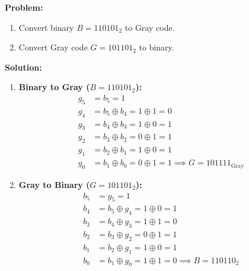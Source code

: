 \begin{examplebox}
\textbf{Problem:}
\begin{enumerate}
    \item Convert binary $B = 110101_2$ to Gray code.
    \item Convert Gray code $G = 101101_2$ to binary.
\end{enumerate}

\textbf{Solution:}
\begin{enumerate}
    \item \textbf{Binary to Gray ($B = 110101_2$):}
    \begin{align*}
    g_5 &= b_5 = 1 \\
    g_4 &= b_5 \oplus b_4 = 1 \oplus 1 = 0 \\
    g_3 &= b_4 \oplus b_3 = 1 \oplus 0 = 1 \\
    g_2 &= b_3 \oplus b_2 = 0 \oplus 1 = 1 \\
    g_1 &= b_2 \oplus b_1 = 1 \oplus 0 = 1 \\
    g_0 &= b_1 \oplus b_0 = 0 \oplus 1 = 1 \implies G = 101111_{\text{Gray}}
    \end{align*}
    \item \textbf{Gray to Binary ($G = 101101_2$):}
    \begin{align*}
    b_5 &= g_5 = 1 \\
    b_4 &= b_5 \oplus g_4 = 1 \oplus 0 = 1 \\
    b_3 &= b_4 \oplus g_3 = 1 \oplus 1 = 0 \\
    b_2 &= b_3 \oplus g_2 = 0 \oplus 1 = 1 \\
    b_1 &= b_2 \oplus g_1 = 1 \oplus 0 = 1 \\
    b_0 &= b_1 \oplus g_0 = 1 \oplus 1 = 0 \implies B = 110110_2
    \end{align*}
\end{enumerate}
\end{examplebox}

